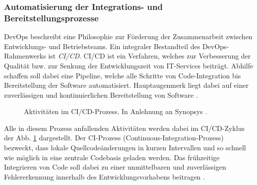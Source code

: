 \subsubsection{Automatisierung der Integrations- und Bereitstellungsprozesse}
\label{sec:CICD}
DevOps beschreibt eine Philosophie zur Förderung der Zusammenarbeit zwischen Entwicklungs- und Betriebsteams. Ein integraler Bestandteil des DevOps-Rahmen\-werks ist \textit{\ac{CI/CD}}. CI/CD ist ein Verfahren, welches zur Verbesserung der Qualität bzw. zur Senkung der Entwicklungszeit von IT-Services beiträgt. Abhilfe schaffen soll dabei eine Pipeline, welche alle Schritte von Code-Integration bis Bereitstellung der Software automatisiert. Hauptaugenmerk liegt dabei auf einer zuverlässigen und kontinuierlichen Bereitstellung von Software \cite[471]{Zampetti.92720211012021}.
\begin{center}
	\begin{figure}[H]
		\centering
		\captionsetup{format=myformat}
		\caption[Aktivitäten im CI/CD-Prozess]{Aktivitäten im CI/CD-Prozess. In Anlehnung an Synopsys \cite{.20230201}.}
		\label{fig:CICD_Cycle}
	\end{figure}
\end{center}
\vspace*{-15mm}
Alle in diesem Prozess anfallenden Aktivitäten werden dabei im CI/CD-Zyklus der Abb. \ref*{fig:CICD_Cycle} dargestellt. Der \acs{CI}-Prozess (Continuous-Integration-Prozess) bezweckt, dass lokale Quellcode\-änderungen in kurzen Intervallen und so schnell wie möglich in eine zentrale Codebasis geladen werden. Das frühzeitige Integrieren von Code soll dabei zu einer unmittelbaren und zuverlässigen Fehlererkennung innerhalb des Entwicklungsvorhabens beitragen \cite[471]{Zampetti.92720211012021}. 

